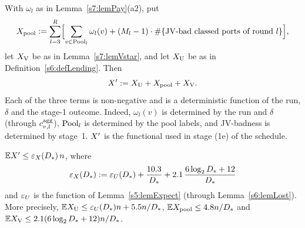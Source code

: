 \begin{definition}\label{s7:defXprime}
With $\omega_l$ as in Lemma~\ref{s7:lemPay}(a2), put
\[
X_{\mathrm{pool}}\mathrel{:=}\sum_{l=3}^{R}\Bigl[\sum_{v\in\mathrm{Pool}_l}\omega_l(v)+(M_l-1)\cdot\#\{\text{JV-bad classed ports of round }l\}\Bigr],
\]
let $X_{\mathrm{V}}$ be as in Lemma~\ref{s7:lemVstar}, and let $X_{\mathrm{U}}$ be as in
Definition~\ref{s6:defLending}. Then
\[
X'\mathrel{:=}X_{\mathrm{U}}+X_{\mathrm{pool}}+X_{\mathrm{V}} .
\]
Each of the three terms is non-negative and is a deterministic function of the
run, $\delta$ and the stage-1 outcome. Indeed, $\omega_l(v)$ is determined by the
run and $\delta$ (through $c^{\mathrm{agg}}_{v,l}$), $\mathrm{Pool}_l$ is determined by the pool
labels, and JV-badness is determined by stage~1. $\Xp$ is the functional used in
stage (1e) of the schedule.
\deps{\ref{s6:defLending}, \ref{s7:lemVstar}, \ref{s7:lemPay}}
\end{definition}

\begin{lemma}[Expectation of $\Xp$]\label{s7:lemEXprime}
$\mathbb{E}X'\le\varepsilon_{X}(D_{*})\,n$, where
\[
\varepsilon_{X}(D_{*})\mathrel{:=}\varepsilon_{U}(D_{*})+\frac{10.3}{D_{*}}+2.1\,\frac{6\log_2D_{*}+12}{D_{*}}
\]
and $\varepsilon_{U}$ is the function of Lemma~\ref{s5:lemExpect} (through
Lemma~\ref{s6:lemLost}). More precisely, $\mathbb{E}X_{\mathrm{U}}\le\varepsilon_{U}(D_{*})n+5.5n/D_{*}$,
$\mathbb{E}X_{\mathrm{pool}}\le4.8n/D_{*}$ and $\mathbb{E}X_{\mathrm{V}}\le2.1(6\log_2D_{*}+12)n/D_{*}$.
\deps{\ref{s7:defXprime}, \ref{s6:lemLost}, \ref{s7:lemCand}, \ref{s7:lemVstar}, \ref{s2:propOV}, \ref{s2:propStructure}, \ref{s2:lemTower}, \ref{s5:lemExpect}, \ref{s2:lemCap}}
\end{lemma}

